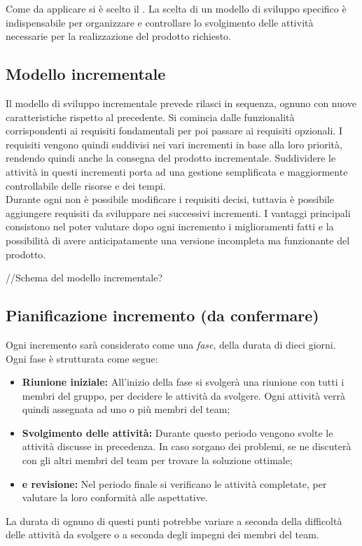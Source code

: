 Come  da applicare si è scelto il . La scelta di un modello di sviluppo specifico è indispensabile per organizzare e controllare lo svolgimento delle attività necessarie per la realizzazione del prodotto richiesto.

\subsection{Modello incrementale}
Il modello di sviluppo incrementale prevede rilasci in sequenza, ognuno con nuove caratteristiche rispetto al precedente. Si comincia dalle funzionalità corrispondenti ai requisiti fondamentali per poi passare ai requisiti opzionali. I requisiti vengono quindi suddivisi nei vari incrementi in base alla loro priorità, rendendo quindi anche la consegna del prodotto incrementale.
Suddividere le attività in questi incrementi porta ad una gestione semplificata e maggiormente controllabile delle risorse e dei tempi.\\
Durante ogni  non è possibile modificare i requisiti decisi, tuttavia è possibile aggiungere requisiti da sviluppare nei successivi incrementi.
I vantaggi principali consistono nel poter valutare dopo ogni incremento i miglioramenti fatti e la possibilità di avere anticipatamente una versione incompleta ma funzionante del prodotto. \\
\begin{center}
//Schema del modello incrementale?
\end{center}
\subsection{Pianificazione incremento (da confermare)}
Ogni incremento sarà considerato come una \textit{fase}, della durata di dieci giorni. Ogni fase è strutturata come segue:
\begin{itemize}
\item \textbf{Riunione iniziale:} All'inizio della fase si svolgerà una riunione con tutti i membri del gruppo, per decidere le attività da svolgere. Ogni attività verrà quindi assegnata ad uno o più membri del team;
\item \textbf{Svolgimento delle attività:} Durante questo periodo vengono svolte le attività discusse in precedenza. In caso sorgano dei problemi, se ne discuterà con gli altri membri del team per trovare la soluzione ottimale;
\item \textbf{ e revisione:} Nel periodo finale si verificano le attività completate, per valutare la loro conformità alle aspettative.
\end{itemize}
La durata di ognuno di questi punti potrebbe variare a seconda della difficoltà delle attività da svolgere o a seconda degli impegni dei membri del team.
\newpage